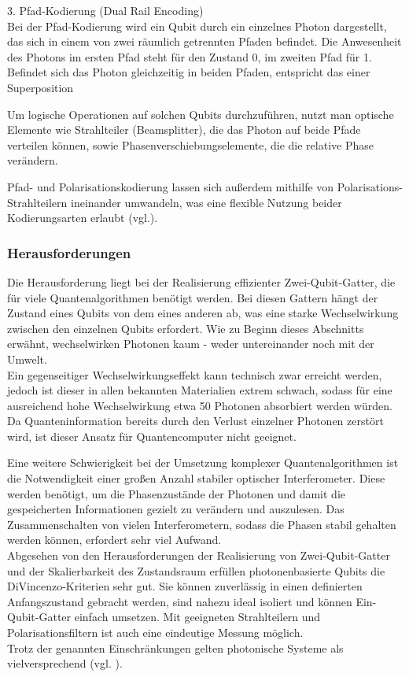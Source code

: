 3. Pfad-Kodierung (Dual Rail Encoding)\\
Bei der Pfad-Kodierung wird ein Qubit durch ein einzelnes Photon dargestellt, das sich in einem von zwei räumlich getrennten Pfaden befindet. Die Anwesenheit des Photons im ersten Pfad steht für den Zustand 0, im zweiten Pfad für 1. Befindet sich das Photon gleichzeitig in beiden Pfaden, entspricht das einer Superposition


Um logische Operationen auf solchen Qubits durchzuführen, nutzt man optische Elemente wie Strahlteiler (Beamsplitter), die das Photon auf beide Pfade verteilen können, sowie Phasenverschiebungselemente, die die relative Phase verändern. 


Pfad- und Polarisationskodierung lassen sich außerdem mithilfe von Polarisations-Strahlteilern ineinander umwandeln, was eine flexible Nutzung beider Kodierungsarten erlaubt (vgl.\cite[Ch. 7.4]{nielsen_quantum_2010}).\\

\subsubsection{Herausforderungen}
Die Herausforderung liegt bei der Realisierung effizienter Zwei-Qubit-Gatter, die für viele Quantenalgorithmen benötigt werden. Bei diesen Gattern hängt der Zustand eines Qubits von dem eines anderen ab, was eine starke Wechselwirkung zwischen den einzelnen Qubits erfordert. Wie zu Beginn dieses Abschnitts erwähnt, wechselwirken Photonen kaum - weder untereinander noch mit der Umwelt. \\
Ein gegenseitiger Wechselwirkungseffekt kann technisch zwar erreicht werden, jedoch ist dieser in allen bekannten Materialien extrem schwach, sodass für eine ausreichend hohe Wechselwirkung etwa 50 Photonen absorbiert werden würden. Da Quanteninformation bereits durch den Verlust einzelner Photonen zerstört wird, ist dieser Ansatz für Quantencomputer nicht geeignet. 


Eine weitere Schwierigkeit bei der Umsetzung komplexer Quantenalgorithmen ist die Notwendigkeit einer großen Anzahl stabiler optischer Interferometer. Diese werden benötigt, um die Phasenzustände der Photonen und damit die gespeicherten Informationen gezielt zu verändern und auszulesen. Das Zusammenschalten von vielen Interferometern, sodass die Phasen stabil gehalten werden können, erfordert sehr viel Aufwand. \\


Abgesehen von den Herausforderungen der Realisierung von Zwei-Qubit-Gatter und der Skalierbarkeit des Zustandsraum erfüllen photonenbasierte Qubits die DiVincenzo-Kriterien sehr gut. Sie können zuverlässig in einen definierten Anfangszustand gebracht werden, sind nahezu ideal isoliert und können Ein-Qubit-Gatter einfach umsetzen. Mit geeigneten Strahlteilern und Polarisationsfiltern ist auch eine eindeutige Messung möglich. \\
Trotz der genannten Einschränkungen gelten photonische Systeme als vielversprechend (vgl. \cite[Ch. 7.4]{nielsen_quantum_2010}).





